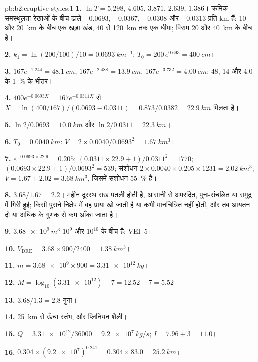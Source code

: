 \begin{solution}{pb:b2:eruptive-styles:1}
\textbf{1.} $\ln T = 5.298$, $4.605$, $3.871$, $2.639$, $1.386$। क्रमिक समस्थूलता-रेखाओं के बीच
ढालें $-0.0693$, $-0.0367$, $-0.0308$ और $-0.0313$ प्रति km हैं: 10 और \qty{20}{km}
के बीच एक खड़ा खंड, 40 से \qty{120}{km} तक एक धीमा;
विराम 20 और \qty{40}{km} के बीच है।

\textbf{2.} $k_1 = \ln(200/100)/10 = \qty{0.0693}{km^{-1}}$; $T_0 = 200\,e^{0.693} =
\qty{400}{cm}$।

\textbf{3.} $167e^{-1.244} = \qty{48.1}{cm}$, $167e^{-2.488} = \qty{13.9}{cm}$,
$167e^{-3.732} = \qty{4.00}{cm}$: 48, 14 और 4.0 के \qty{1}{\percent} के भीतर।

\textbf{4.} $400e^{-0.0693X} = 167e^{-0.0311X}$ से $X = \ln(400/167)/(0.0693 -
0.0311) = 0.873/0.0382 = \qty{22.9}{km}$ मिलता है।

\textbf{5.} $\ln2/0.0693 = \qty{10.0}{km}$ और $\ln2/0.0311 = \qty{22.3}{km}$।

\textbf{6.} $T_0 = \qty{0.0040}{km}$: $V = 2\times0.0040/0.0693^2 =
\qty{1.67}{km^3}$।

\textbf{7.} $e^{-0.0693\times22.9} = 0.205$; $(0.0311\times22.9 + 1)/0.0311^2 = 1770$;
$(0.0693\times22.9 + 1)/0.0693^2 = 539$; संशोधन $2\times0.0040\times0.205\times1231 =
\qty{2.02}{km^3}$; $V = 1.67 + 2.02 = \qty{3.68}{km^3}$, जिसमें संशोधन
\qty{55}{\percent} है।

\textbf{8.} $3.68/1.67 = 2.2$। महीन दूरस्थ राख पतली होती है, आसानी से अपरदित,
पुनः-संचलित या समुद्र में गिरी हुई; किसी पुराने निक्षेप में वह प्रायः खो जाती है या कभी
मानचित्रित नहीं होती, और तब आयतन दो या अधिक के गुणक से कम आँका जाता है।

\textbf{9.} $\qty{3.68e9}{m^3}$ $10^9$ और $10^{10}$ के बीच है: VEI~5।

\textbf{10.} $V_{\mathrm{DRE}} = 3.68\times900/2400 = \qty{1.38}{km^3}$।

\textbf{11.} $m = \num{3.68e9}\times900 = \qty{3.31e12}{kg}$।

\textbf{12.} $M = \log_{10}(\num{3.31e12}) - 7 = 12.52 - 7 = 5.52$।

\textbf{13.} $3.68/1.3 = 2.8$ गुना।

\textbf{14.} \qty{25}{km} से ऊँचा स्तंभ, और प्लिनियन शैली।

\textbf{15.} $Q = \num{3.31e12}/36000 = \qty{9.2e7}{kg/s}$; $I = 7.96 + 3 = 11.0$।

\textbf{16.} $0.304\times(\num{9.2e7})^{0.241} = 0.304\times83.0 = \qty{25.2}{km}$।


\end{solution}
